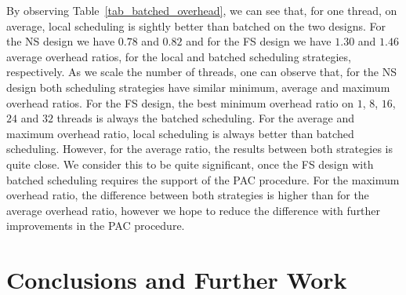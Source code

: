 \documentclass{llncs}
\begin{document}
By observing Table~\ref{tab_batched_overhead}, we can see that, for
one thread, on average, local scheduling is sightly better than
batched on the two designs. For the NS design we have $0.78$ and
$0.82$ and for the FS design we have $1.30$ and $1.46$ average
overhead ratios, for the local and batched scheduling strategies,
respectively. As we scale the number of threads, one can observe that,
for the NS design both scheduling strategies have similar minimum,
average and maximum overhead ratios. For the FS design, the best
minimum overhead ratio on $1$, $8$, $16$, $24$ and $32$ threads is
always the batched scheduling. For the average and maximum overhead
ratio, local scheduling is always better than batched
scheduling. However, for the average ratio, the results between both
strategies is quite close. We consider this to be quite significant,
once the FS design with batched scheduling requires the support of the
PAC procedure. For the maximum overhead ratio, the difference between
both strategies is higher than for the average overhead ratio, however
we hope to reduce the difference with further improvements in the PAC
procedure.

\section{Conclusions and Further Work}







\end{document}
